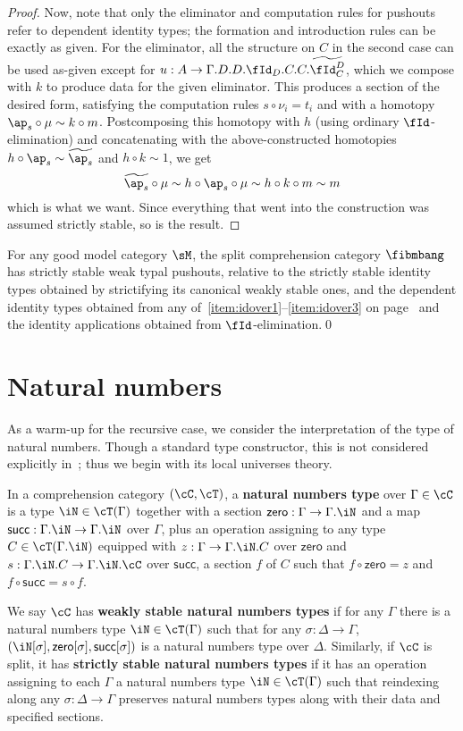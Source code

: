 \documentclass[referee]{psp}
\let\N\iN
\let\C\cC
\let\T\cT
\def\zero{\mathsf{zero}}
\def\succ{\mathsf{succ}}
\let\Id\fId
\newcommand{\Idtwo}[2]{\widetilde{\Id^{#1}_{#2}}}
\newcommand{\aptwo}[1]{\widetilde{\ap_{#1}}}
\begin{document}
\begin{proof}
  Now, note that only the eliminator and computation rules for pushouts refer to dependent identity types; the formation and introduction rules can be exactly as given.
  For the eliminator, all the structure on $C$ in the second case can be used as-given except for $u:A\to \Gamma.D.D.\Id_D.C.C.\Idtwo{D}{C}$, which we compose with $k$ to produce data for the given eliminator.
  This produces a section of the desired form, satisfying the computation rules $s\circ \nu_i = t_i$ and with a homotopy $\ap_s\circ \mu \sim k\circ m$.
  Postcomposing this homotopy with $h$ (using ordinary $\Id$-elimination) and concatenating with the above-constructed homotopies $h\circ \ap_s \sim \aptwo{s}$ and $h\circ k \sim 1$, we get
  \[ \aptwo{s} \circ \mu \sim h\circ \ap_s \circ \mu \sim h\circ k\circ m \sim m \]
  which is what we want.
  Since everything that went into the construction was assumed strictly stable, so is the result.
\end{proof}

\begin{cor}
  For any good model category $\sM$, the split comprehension category $\fibmbang$ has strictly stable weak typal pushouts, relative to the strictly stable identity types obtained by strictifying its canonical weakly stable ones, and the dependent identity types obtained from any of~\ref{item:idover1}--\ref{item:idover3} on page~\pageref{idover} and the identity applications obtained from $\Id$-elimination.\qed
\end{cor}

\section{Natural numbers}
\label{sec:natural-numbers}

As a warm-up for the recursive case, we consider the interpretation of the type of natural numbers.
Though a standard type constructor, this is not considered explicitly in~\cite{lw:localuniv}; thus we begin with its local universes theory.

\begin{defn}
  In a comprehension category $(\C,\T)$, a \textbf{natural numbers type} over $\Gamma\in\C$ is a type $\N\in\T(\Gamma)$ together with a section $\zero:\Gamma\to\Gamma.\N$ and a map $\succ:\Gamma.\N\to\Gamma.\N$ over $\Gamma$, plus an operation assigning to any type $C\in\T(\Gamma.\N)$ equipped with $z:\Gamma\to\Gamma.\N.C$ over $\zero$ and $s:\Gamma.\N.C \to \Gamma.\N.\C$ over $\succ$, a section $f$ of $C$ such that $f \circ \zero = z$ and $f\circ \succ = s \circ f$.

  We say $\C$ has \textbf{weakly stable natural numbers types} if for any $\Gamma$ there is a natural numbers type $\N\in\T(\Gamma)$ such that for any $\sigma:\Delta\to\Gamma$, $(\N[\sigma],\zero[\sigma],\succ[\sigma])$ is a natural numbers type over $\Delta$.
  Similarly, if $\C$ is split, it has \textbf{strictly stable natural numbers types} if it has an operation assigning to each $\Gamma$ a natural numbers type $\N\in\T(\Gamma)$ such that reindexing along any $\sigma:\Delta\to\Gamma$ preserves natural numbers types along with their data and specified sections.
\end{defn}
\end{document}
